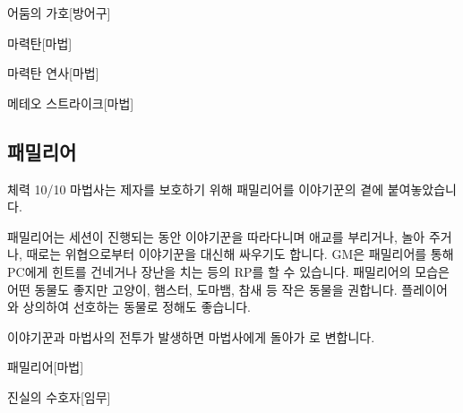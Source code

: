 \documentclass{report}
\begin{document}
		\begin{story}{어둠의 가호}{[방어구]}
			
			
		\end{story}
		
		\begin{story}{마력탄}{[마법]}
		\end{story}
		
		\begin{story}{마력탄 연사}{[마법]}
		\end{story}
		
		\begin{story}{메테오 스트라이크}{[마법]}
		\end{story}
	
	\subsection*{패밀리어}
		체력 10/10
		마법사는 제자를 보호하기 위해 패밀리어를 이야기꾼의 곁에 붙여놓았습니다.
		
		패밀리어는 세션이 진행되는 동안 이야기꾼을 따라다니며 애교를 부리거나, 놀아 주거나, 때로는 위협으로부터 이야기꾼을 대신해 싸우기도 합니다. GM은 패밀리어를 통해 PC에게 힌트를 건네거나 장난을 치는 등의 RP를 할 수 있습니다. 패밀리어의 모습은 어떤 동물도 좋지만 고양이, 햄스터, 도마뱀, 참새 등 작은 동물을 권합니다. 플레이어와 상의하여 선호하는 동물로 정해도 좋습니다.
		
		이야기꾼과 마법사의 전투가 발생하면 마법사에게 돌아가 로 변합니다.
		
		\begin{story}{패밀리어}{[마법]}
		\end{story}
		
		\begin{story}{진실의 수호자}{[임무]}
		\end{story}
		
\end{document}
